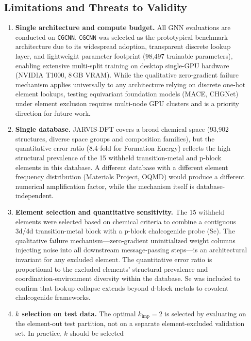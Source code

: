 \documentclass[final,5p,twocolumn,10pt]{elsarticle}
\newcommand{\mae}{\text{MAE}}
\newcommand{\cgcnn}{\texttt{CGCNN}}
\begin{document}
\subsection{Limitations and Threats to Validity}
\label{sec:limitations}

\begin{enumerate}
\item \textbf{Single architecture and compute budget.} All GNN evaluations are conducted on \cgcnn{}.
  \cgcnn{} was selected as the prototypical benchmark architecture due to its widespread adoption,
  transparent discrete lookup layer, and lightweight parameter footprint (98,497 trainable parameters),
  enabling extensive multi-split training on desktop single-GPU hardware (NVIDIA T1000, 8\,GB VRAM).
  While the qualitative zero-gradient failure mechanism applies universally to any architecture relying on
  discrete one-hot element lookups, testing equivariant foundation models (MACE, CHGNet) under
  element exclusion requires multi-node GPU clusters and is a priority direction for future work.
\item \textbf{Single database.} JARVIS-DFT covers a broad chemical space (93,902 structures,
  diverse space groups and composition families), but the quantitative error ratio (8.4-fold for
  Formation Energy) reflects the high structural prevalence of the 15 withheld
  transition-metal and p-block elements in this database. A different
  database with a different element frequency distribution (Materials Project,
  OQMD) would produce a different numerical amplification factor, while the
  mechanism itself is database-independent.
\item \textbf{Element selection and quantitative sensitivity.} The 15 withheld elements
  were selected based on chemical criteria to combine a contiguous 3d/4d transition-metal
  block with a p-block chalcogenide probe (Se). The qualitative failure
  mechanism---zero-gradient uninitialized weight columns injecting noise into
  all downstream message-passing steps---is an architectural invariant for any
  excluded element. The quantitative error ratio is proportional to the excluded
  elements' structural prevalence and coordination-environment diversity within the
  database. Se was included to confirm that lookup collapse extends beyond d-block
  metals to covalent chalcogenide frameworks.
\item \textbf{$k$ selection on test data.} The optimal $k_{\text{imp}} = 2$
  is selected by evaluating \mae{} on the element-out test partition, not on a
  separate element-excluded validation set. In practice, $k$ should be selected

\end{enumerate}
\end{document}
